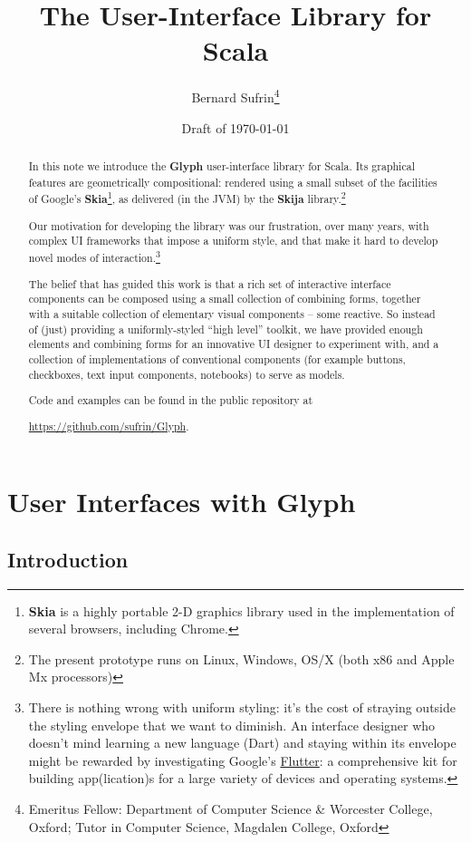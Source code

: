 \documentclass[12pt,a4paper]{article}
\author{Bernard Sufrin\thanks{Emeritus Fellow: Department of Computer
Science \& Worcester College, Oxford; Tutor in Computer Science,
Magdalen College, Oxford}}
\title{The \Glyph User-Interface Library for Scala}
\date{Draft of \today}
\def\Glyph{\textbf{Glyph}\xspace}
\def\Skia{\textbf{Skia}\xspace}
\def\S#1{\section{#1}}
\def\SS#1{\subsection{#1}}
\begin{document}
\maketitle
\begin{abstract}

In this note we introduce the \Glyph user-interface library for Scala.  Its
graphical features are geometrically compositional:  rendered using
a small subset of the facilities of  Google's \Skia{\footnote{\Skia
is a highly portable 2-D graphics library used in the implementation of several
browsers, including Chrome.}}, as delivered (in the JVM) by the \textbf{Skija}
library.\footnote{The present prototype
runs on Linux, Windows, OS/X (both x86 and Apple Mx processors)}

Our motivation for developing the library was our frustration, over many years,
with complex UI frameworks that impose a uniform style, and that make
it hard to develop novel modes of interaction.\footnote{There is
nothing wrong with uniform styling: it's the cost of straying outside
the styling envelope that we want to diminish. An interface designer
who doesn't mind learning a new language (Dart) and staying within its
envelope might be rewarded by investigating Google's
\href{https://api.flutter.dev/index.html}{Flutter}: a comprehensive kit
for building app(lication)s for a large variety of devices
and operating systems.} 

The belief that has guided this work is that a rich set of interactive
interface components can be composed using a small collection of combining
forms, together with a suitable collection of elementary visual
components -- some reactive.
So instead of (just) providing a uniformly-styled ``high level''
toolkit, we have provided enough elements and combining forms for
an innovative UI designer to experiment with, and a collection of
implementations of conventional components (for example buttons,
checkboxes, text input components, notebooks) to serve as models.

Code and examples can be found in
the public repository at
\begin{center}
\href{https://github.com/sufrin/Glyph}{https://github.com/sufrin/Glyph}.
\end{center}\vfill
\end{abstract}
\clearpage
\tableofcontents
\clearpage
\listoffigures
\clearpage



\S{User Interfaces with Glyph}
\SS{Introduction}
\end{document}
